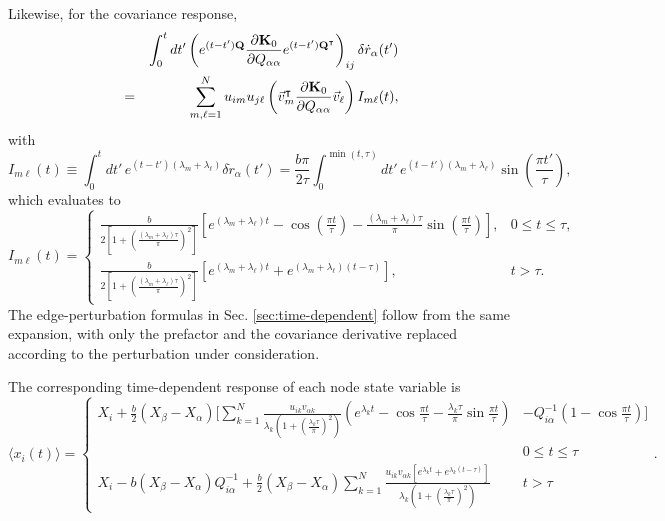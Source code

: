 Likewise, for the covariance response,
\begin{eqnarray}
&&\int_0^t dt' \left(
e^{(t-t'){\bf Q}}
\frac{\partial {\bf K}_0}{\partial Q_{\alpha\alpha}}
e^{(t-t'){\bf Q}^\intercal}
\right)_{ij}\delta \dot{r}_\alpha(t') \nonumber\\
&=&\sum_{m,\ell=1}^N
u_{im}u_{j\ell}\left(
{\vec v_m}^\intercal
\frac{\partial {\bf K}_0}{\partial Q_{\alpha\alpha}}
{\vec v_\ell}
\right)I_{m\ell}(t),
\end{eqnarray}
with
\begin{equation}
I_{m\ell}(t)\equiv
\int_0^t dt' \, e^{(t-t')(\lambda_m+\lambda_\ell)}\delta \dot r_\alpha(t')
=\frac{b\pi}{2\tau}\int_0^{\min(t,\tau)} dt' \, e^{(t-t')(\lambda_m+\lambda_\ell)}\sin\left(\frac{\pi t'}{\tau}\right),
\label{Iml}
\end{equation}
which evaluates to
\begin{equation}
I_{m\ell}(t)=
\begin{cases}
\displaystyle
\frac{b}{2\left[1+\left(\frac{(\lambda_m+\lambda_\ell)\tau}{\pi}\right)^2\right]}
\left[
e^{(\lambda_m+\lambda_\ell)t}
-\cos\left(\frac{\pi t}{\tau}\right)
-\frac{(\lambda_m+\lambda_\ell)\tau}{\pi}\sin\left(\frac{\pi t}{\tau}\right)
\right], & 0\le t\le \tau, \\[1.2ex]
\displaystyle
\frac{b}{2\left[1+\left(\frac{(\lambda_m+\lambda_\ell)\tau}{\pi}\right)^2\right]}
\left[
e^{(\lambda_m+\lambda_\ell)t}
+e^{(\lambda_m+\lambda_\ell)(t-\tau)}
\right], & t>\tau .
\end{cases}
\end{equation}
The edge-perturbation formulas in Sec. \ref{sec:time-dependent} follow from the same expansion, with only the prefactor and the covariance derivative replaced according to the perturbation under consideration.

The corresponding time-dependent response of each node state variable is
\begin{equation}
      \langle x_i(t)\rangle=\begin{cases}  X_i+ \frac{b}{2} (X_\beta-X_\alpha)\bigg[\sum_{k=1}^N\frac{u_{ik}v_{\alpha k}}{\lambda_k(1+(\frac{\lambda_k\tau}{\pi})^2)}\left(e^{\lambda_kt}-\cos\frac{\pi t}{\tau}-\frac{\lambda_k\tau}{\pi}\sin\frac{\pi t}{\tau}  \right)&-Q^{-1}_{i\alpha} \left(1-\cos\frac{\pi t}{\tau}\right)\bigg] \\
     & 0\leq t\leq\tau\\
     X_i-b (X_\beta-X_\alpha)Q^{-1}_{i\alpha}+\frac{b}{2} (X_\beta-X_\alpha)\sum_{k=1}^N\frac{u_{ik}v_{\alpha k}[ e^{\lambda_kt}+e^{\lambda_k(t-\tau)}]}{\lambda_k(1+(\frac{\lambda_k\tau}{\pi})^2)} &t>\tau
     \end{cases}.
\end{equation}


